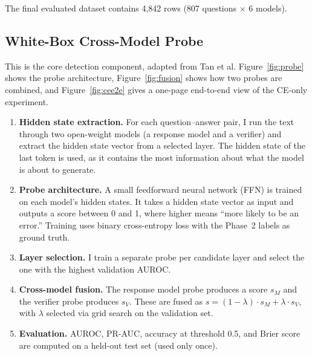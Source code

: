 \documentclass[11pt]{article}
\begin{document}
The final evaluated dataset contains 4,842 rows (807 questions $\times$ 6 models).

\subsection{White-Box Cross-Model Probe}

This is the core detection component, adapted from Tan et al. Figure~\ref{fig:probe} shows the probe architecture, Figure~\ref{fig:fusion} shows how two probes are combined, and Figure~\ref{fig:cee2e} gives a one-page end-to-end view of the CE-only experiment.

\begin{enumerate}
    \item \textbf{Hidden state extraction.} For each question--answer pair, I run the text through two open-weight models (a response model and a verifier) and extract the hidden state vector from a selected layer. The hidden state of the last token is used, as it contains the most information about what the model is about to generate.

    \item \textbf{Probe architecture.} A small feedforward neural network (FFN) is trained on each model's hidden states. It takes a hidden state vector as input and outputs a score between 0 and 1, where higher means ``more likely to be an error.'' Training uses binary cross-entropy loss with the Phase~2 labels as ground truth.

    \item \textbf{Layer selection.} I train a separate probe per candidate layer and select the one with the highest validation AUROC.

    \item \textbf{Cross-model fusion.} The response model probe produces a score $s_M$ and the verifier probe produces $s_V$. These are fused as $s = (1 - \lambda) \cdot s_M + \lambda \cdot s_V$, with $\lambda$ selected via grid search on the validation set.

    \item \textbf{Evaluation.} AUROC, PR-AUC, accuracy at threshold 0.5, and Brier score are computed on a held-out test set (used only once).
\end{enumerate}
\end{document}
